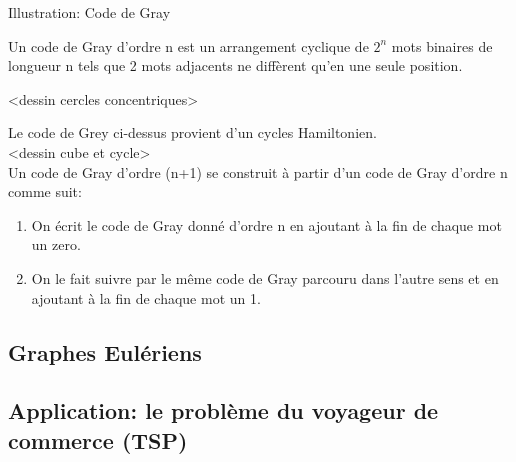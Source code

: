Illustration: Code de Gray

Un code de Gray d'ordre n est un arrangement cyclique de $2^{n}$ mots binaires de longueur n tels que 2 mots adjacents ne diffèrent qu'en une seule position.\\

\begin{exmp}
<dessin cercles concentriques>
\end{exmp}

Le code de Grey ci-dessus provient d'un cycles Hamiltonien.\\

<dessin cube et cycle>\\

Un code de Gray d'ordre (n+1) se construit à partir d'un code de Gray d'ordre n comme suit:

\begin{enumerate}
\item On écrit le code de Gray donné d'ordre n en ajoutant à la fin de chaque mot un zero.
\item On le fait suivre par le même code de Gray parcouru dans l'autre sens et en ajoutant à la fin de chaque mot un 1.
\end{enumerate}


\subsection{Graphes Eulériens}



\subsection{Application: le problème du voyageur de commerce (TSP)}

